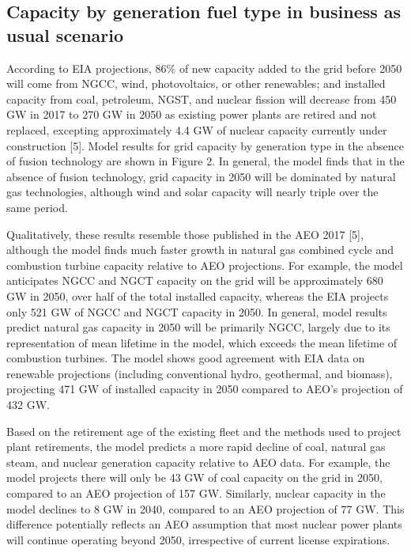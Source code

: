 \documentclass[preprint, 12pt]{elsarticle}
\begin{document}
\subsection{Capacity by generation fuel type in business as usual scenario}


According to EIA projections, 86\% of new capacity added to the grid before 2050 will come from NGCC, wind, photovoltaics, or other renewables; and installed capacity from coal, petroleum, NGST, and nuclear fission will decrease from 450 GW in 2017 to 270 GW in 2050 as existing power plants are retired and not replaced, excepting approximately 4.4 GW of nuclear capacity currently under construction [5]. Model results for grid capacity by generation type in the absence of fusion technology are shown in Figure 2. In general, the model finds that in the absence of fusion technology, grid capacity in 2050 will be dominated by natural gas technologies, although wind and solar capacity will nearly triple over the same period.

Qualitatively, these results resemble those published in the AEO 2017 [5], although the model finds much faster growth in natural gas combined cycle and combustion turbine capacity relative to AEO projections. For example, the model anticipates NGCC and NGCT capacity on the grid will be approximately 680 GW in 2050, over half of the total installed capacity, whereas the EIA projects only 521 GW of NGCC and NGCT capacity in 2050. In general, model results predict natural gas capacity in 2050 will be primarily NGCC, largely due to its representation of mean lifetime in the model, which exceeds the mean lifetime of combustion turbines. The model shows good agreement with EIA data on renewable projections (including conventional hydro, geothermal, and biomass), projecting 471 GW of installed capacity in 2050 compared to AEO’s projection of 432 GW.

Based on the retirement age of the existing fleet and the methods used to project plant retirements, the model predicts a more rapid decline of coal, natural gas steam, and nuclear generation capacity relative to AEO data. For example, the model projects there will only be 43 GW of coal capacity on the grid in 2050, compared to an AEO projection of 157 GW. Similarly, nuclear capacity in the model declines to 8 GW in 2040, compared to an AEO projection of 77 GW. This difference potentially reflects an AEO assumption that most nuclear power plants will continue operating beyond 2050, irrespective of current license expirations.
\end{document}
